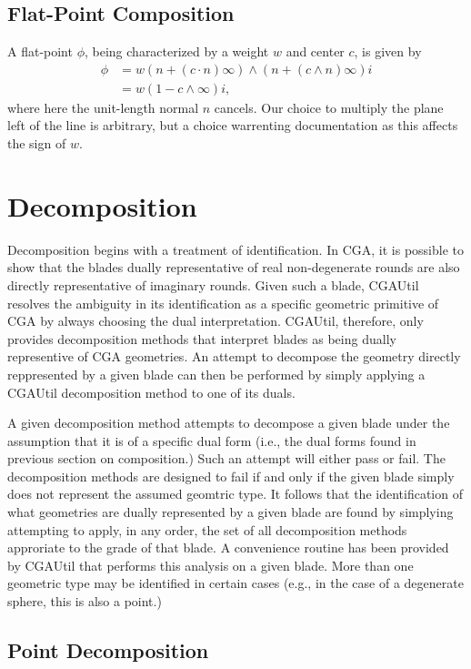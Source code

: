 \documentclass[12pt]{article}
\newcommand{\nvai}{\infty}
\begin{document}
\subsection{Flat-Point Composition}

A flat-point $\phi$, being characterized by a weight $w$ and center $c$, is given
by
\begin{align}\label{equ_flatpoint}
\phi &= w(n+(c\cdot n)\nvai)\wedge(n+(c\wedge n)\nvai)i \\
 &= w(1-c\wedge\nvai)i,
\end{align}
where here the unit-length normal $n$ cancels.  Our choice to multiply the plane
left of the line is arbitrary, but a choice warrenting documentation as this affects the sign of $w$.

\section{Decomposition}

Decomposition begins with a treatment of identification.  In CGA, it is possible
to show that the blades dually representative of real non-degenerate rounds are also
directly representative of imaginary rounds.  Given such a blade, CGAUtil resolves
the ambiguity in its identification as a specific geometric primitive of CGA by always
choosing the dual interpretation.  CGAUtil, therefore, only provides decomposition methods
that interpret blades as being dually representive of CGA geometries.  An attempt
to decompose the geometry directly reppresented by a given blade can then be
performed by simply applying a CGAUtil decomposition method to one of its duals.

A given decomposition method attempts to decompose a given blade
under the assumption that
it is of a specific dual form (i.e., the dual forms found in previous section on composition.)
Such an attempt will either pass or fail.
The decomposition methods are designed to fail if and only if the given blade
simply does not represent the assumed geomtric type.  It follows that the identification of
what geometries are dually represented by a given blade are found by simplying
attempting to apply, in any order, the set of all decomposition methods approriate
to the grade of that blade.  A convenience routine has been provided by CGAUtil
that performs this analysis on a given blade.  More than one geometric type
may be identified in certain cases (e.g., in the case of a degenerate sphere, this
is also a point.)

\subsection{Point Decomposition}
\end{document}

